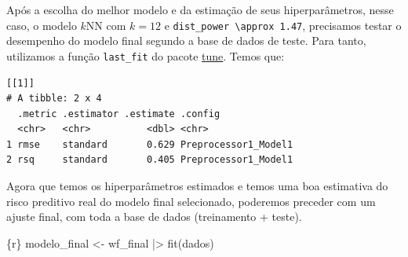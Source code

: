 \documentclass[
  letterpaper,
  DIV=11,
  numbers=noendperiod,
  oneside]{scrartcl}
\newenvironment{Shaded}{\begin{snugshade}}{\end{snugshade}}
\newcommand{\AttributeTok}[1]{\textcolor[rgb]{0.40,0.45,0.13}{#1}}
\newcommand{\FunctionTok}[1]{\textcolor[rgb]{0.28,0.35,0.67}{#1}}
\newcommand{\InformationTok}[1]{\textcolor[rgb]{0.37,0.37,0.37}{#1}}
\newcommand{\NormalTok}[1]{\textcolor[rgb]{0.00,0.23,0.31}{#1}}
\newcommand{\OtherTok}[1]{\textcolor[rgb]{0.00,0.23,0.31}{#1}}
\newcommand{\SpecialCharTok}[1]{\textcolor[rgb]{0.37,0.37,0.37}{#1}}
\newcommand{\StringTok}[1]{\textcolor[rgb]{0.13,0.47,0.30}{#1}}
\begin{document}
Após a escolha do melhor modelo e da estimação de seus hiperparâmetros,
nesse caso, o modelo \(k\)NN com \(k = 12\) e
\texttt{dist\_power\ \textbackslash{}approx\ 1.47}, precisamos testar o
desempenho do modelo final segundo a base de dados de teste. Para tanto,
utilizamos a função \texttt{last\_fit} do pacote
\href{https://tune.tidymodels.org/reference/last_fit.html}{tune}. Temos
que:

\begin{Shaded}
\end{Shaded}

\begin{verbatim}
[[1]]
# A tibble: 2 x 4
  .metric .estimator .estimate .config             
  <chr>   <chr>          <dbl> <chr>               
1 rmse    standard       0.629 Preprocessor1_Model1
2 rsq     standard       0.405 Preprocessor1_Model1
\end{verbatim}

Agora que temos os hiperparâmetros estimados e temos uma boa estimativa
do risco preditivo real do modelo final selecionado, poderemos preceder
com um ajuste final, com toda a base de dados (treinamento + teste).

\begin{Shaded}
\begin{Highlighting}[]
\InformationTok{\textasciigrave{}\textasciigrave{}\textasciigrave{}\{r\}}
\NormalTok{modelo\_final }\OtherTok{\textless{}{-}} 
\NormalTok{  wf\_final }\SpecialCharTok{|\textgreater{}} 
  \FunctionTok{fit}\NormalTok{(dados)}
\InformationTok{\textasciigrave{}\textasciigrave{}\textasciigrave{}}
\end{Highlighting}
\end{Shaded}
\end{document}
